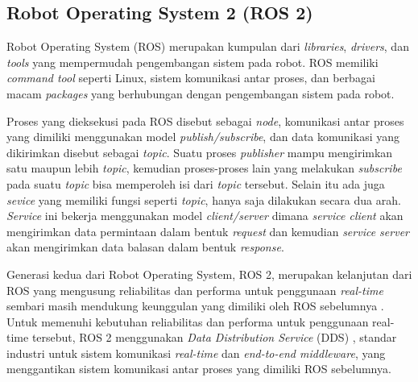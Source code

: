 \subsection{Robot Operating System 2 (ROS 2)}
\label{subsec:ros2}

Robot Operating System (ROS) \citep{quigley2009} merupakan kumpulan dari \emph{libraries}, \emph{drivers},
  dan \emph{tools} yang mempermudah pengembangan sistem pada robot.
ROS memiliki \emph{command tool} seperti Linux,
  sistem komunikasi antar proses, dan berbagai macam \emph{packages} yang berhubungan dengan pengembangan sistem pada robot.

Proses yang dieksekusi pada ROS disebut sebagai \emph{node},
  komunikasi antar proses yang dimiliki menggunakan model \emph{publish/subscribe},
  dan data komunikasi yang dikirimkan disebut sebagai \emph{topic}.
Suatu proses \emph{publisher} mampu mengirimkan satu maupun lebih \emph{topic},
  kemudian proses-proses lain yang melakukan \emph{subscribe} pada suatu \emph{topic} bisa memperoleh isi dari \emph{topic} tersebut.
Selain itu ada juga \emph{sevice} yang memiliki fungsi seperti \emph{topic},
  hanya saja dilakukan secara dua arah.
\emph{Service} ini bekerja menggunakan model \emph{client/server} dimana \emph{service client} akan mengirimkan data permintaan dalam bentuk \emph{request} dan kemudian \emph{service server} akan mengirimkan data balasan dalam bentuk \emph{response}.

Generasi kedua dari Robot Operating System, ROS 2,
  merupakan kelanjutan dari ROS yang mengusung reliabilitas dan performa untuk penggunaan \emph{real-time} sembari masih mendukung keunggulan yang dimiliki oleh ROS sebelumnya \citep{maruyama2016}.
Untuk memenuhi kebutuhan reliabilitas dan performa untuk penggunaan real-time tersebut,
  ROS 2 menggunakan \emph{Data Distribution Service} (DDS) \citep{castellote2003}\citep{schlesselman2004},
  standar industri untuk sistem komunikasi \emph{real-time} dan \emph{end-to-end middleware},
  yang menggantikan sistem komunikasi antar proses yang dimiliki ROS sebelumnya.
